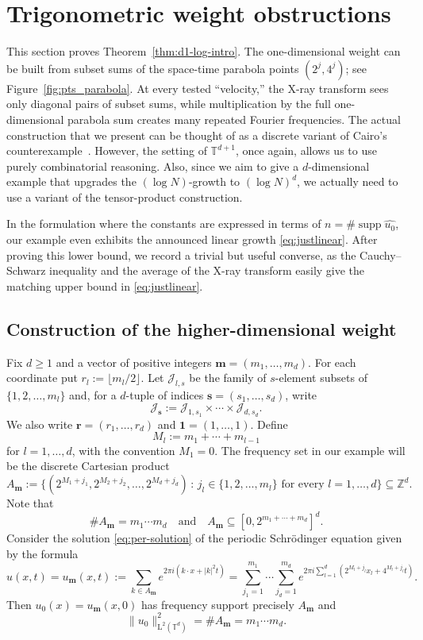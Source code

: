\documentclass[10pt,a4paper]{amsart}
\numberwithin{equation}{section}
\newcommand{\supp}{\operatorname{supp}}
\renewcommand{\ge}{\geqslant}
\begin{document}
\section{Trigonometric weight obstructions}
\label{sec:d1-log-weight}

This section proves Theorem~\ref{thm:d1-log-intro}. 
The one-dimensional weight can be built from subset sums of the space-time parabola points $(2^j,4^j)$; see Figure~\ref{fig:pts_parabola}. At every tested ``velocity,'' the X-ray transform sees only diagonal pairs of subset sums, while multiplication by the full one-dimensional parabola sum creates many repeated Fourier frequencies. 
The actual construction that we present can be thought of as a discrete variant of Cairo's counterexample~\cite{Cairo}. However, the setting of $\mathbb{T}^{d+1}$, once again, allows us to use purely combinatorial reasoning.
Also, since we aim to give a $d$-dimensional example that upgrades the $(\log N)$-growth to $(\log N)^d$, we actually need to use a variant of the tensor-product construction.

In the formulation where the constants are expressed in terms of $n=\#\supp\widehat{u_0}$, our example even exhibits the announced linear growth \eqref{eq:justlinear}. 
After proving this lower bound, we record a trivial but useful converse, as the Cauchy--Schwarz inequality and the average of the X-ray transform easily give the matching upper bound in \eqref{eq:justlinear}.

\subsection{Construction of the higher-dimensional weight}
Fix $d\ge1$ and a vector of positive integers $\mathbf{m}=(m_1,\ldots,m_d)$.
For each coordinate put $r_l:=\lfloor m_l/2\rfloor$. Let $\mathcal{J}_{l,s}$ be the family of $s$-element subsets of $\{1,2,\ldots,m_l\}$ and, for a $d$-tuple of indices $\mathbf{s}=(s_1,\ldots,s_d)$, write 
\[ \mathcal{J}_{\mathbf{s}}:=\mathcal{J}_{1,s_1}\times\cdots\times\mathcal{J}_{d,s_d}. \]
We also write $\mathbf{r}=(r_1,\ldots,r_d)$ and $\mathbf{1}=(1,\ldots,1)$.
Define
\[ M_l:=m_1+\cdots+m_{l-1} \]
for $l=1,\ldots,d$, with the convention $M_1=0$. The frequency set in our example will be the discrete Cartesian product
\[ A_{\mathbf{m}} := \bigl\{(2^{M_1+j_1},2^{M_2+j_2},\ldots,2^{M_d+j_d}) \,:\, j_l\in\{1,2,\ldots,m_l\}\text{ for every }l=1,\ldots,d\bigr\} \subseteq\mathbb{Z}^d. \]
Note that
\[ \#A_{\mathbf{m}}=m_1\cdots m_d \quad\text{and}\quad A_{\mathbf{m}}\subseteq[0,2^{m_1+\cdots+m_d}]^d. \]
Consider the solution \eqref{eq:per-solution} of the periodic Schr\"{o}dinger equation given by the formula
\begin{equation}\label{eq:logNsolution}
u(x,t) = u_{\mathbf{m}}(x,t) :=\sum_{k\in A_{\mathbf{m}}}e^{2\pi i(k\cdot x+|k|^2t)}
= \sum_{j_1=1}^{m_1} \cdots \sum_{j_d=1}^{m_d} e^{2\pi i\sum_{l=1}^d (2^{M_l+j_l}x_l+4^{M_l+j_l}t)}.
\end{equation}
Then $u_0(x) = u_{\mathbf{m}}(x,0)$ has frequency support precisely $A_{\mathbf{m}}$ and
\[ \|u_0\|_{\mathrm{L}^2(\mathbb{T}^d)}^2 = \#A_{\mathbf{m}} = m_1\cdots m_d. \]
\end{document}
